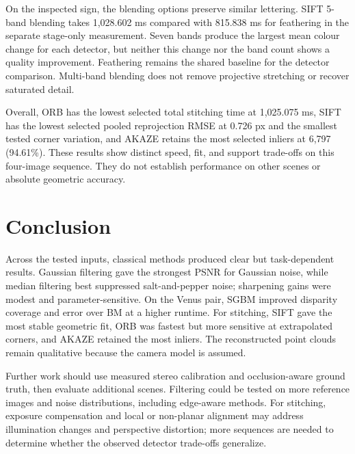\documentclass[a4paper,12pt]{article}
\begin{document}
On the inspected sign, the blending options preserve similar lettering. SIFT 5-band blending takes 1,028.602 ms compared with 815.838 ms for feathering in the separate stage-only measurement. Seven bands produce the largest mean colour change for each detector, but neither this change nor the band count shows a quality improvement. Feathering remains the shared baseline for the detector comparison. Multi-band blending does not remove projective stretching or recover saturated detail.

Overall, ORB has the lowest selected total stitching time at 1,025.075 ms, SIFT has the lowest selected pooled reprojection RMSE at 0.726 px and the smallest tested corner variation, and AKAZE retains the most selected inliers at 6,797 (94.61\%). These results show distinct speed, fit, and support trade-offs on this four-image sequence. They do not establish performance on other scenes or absolute geometric accuracy.

\section{Conclusion}
Across the tested inputs, classical methods produced clear but task-dependent results. Gaussian filtering gave the strongest PSNR for Gaussian noise, while median filtering best suppressed salt-and-pepper noise; sharpening gains were modest and parameter-sensitive. On the Venus pair, SGBM improved disparity coverage and error over BM at a higher runtime. For stitching, SIFT gave the most stable geometric fit, ORB was fastest but more sensitive at extrapolated corners, and AKAZE retained the most inliers. The reconstructed point clouds remain qualitative because the camera model is assumed.

Further work should use measured stereo calibration and occlusion-aware ground truth, then evaluate additional scenes. Filtering could be tested on more reference images and noise distributions, including edge-aware methods. For stitching, exposure compensation and local or non-planar alignment may address illumination changes and perspective distortion; more sequences are needed to determine whether the observed detector trade-offs generalize.
\end{document}
